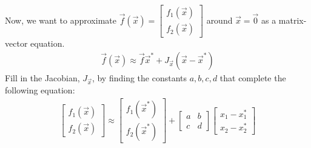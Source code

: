 \begin{enumerate}
    \qitem Now, we want to approximate $\vec{f}(\vec{x}) = \begin{bmatrix} f_1(\vec{x}) \\ f_2(\vec{x}) \end{bmatrix}$ around $\vec{x} = \vec{0}$ as a matrix-vector equation.
    \begin{align*}
        \vec{f}(\vec{x}) \approx \vec{f}{\vec{x}^{*}} + J_{\vec{x}}(\vec{x} - \vec{x}^{*})
    \end{align*}
    Fill in the Jacobian, $J_{\vec{x}}$, by finding the constants $a, b, c, d$ that complete the following equation:
    \begin{align*}
        \begin{bmatrix}
            f_1(\vec{x}) \\
            f_2(\vec{x})
        \end{bmatrix} \approx
        \begin{bmatrix}
            f_1(\vec{x}^{*}) \\
            f_2(\vec{x}^{*})
        \end{bmatrix} +
        \begin{bmatrix}
            a & b \\
            c & d
        \end{bmatrix} 
        \begin{bmatrix}
            x_1 - x_1^{*} \\
            x_2 - x_2^{*}
        \end{bmatrix}
    \end{align*}

\end{enumerate}

